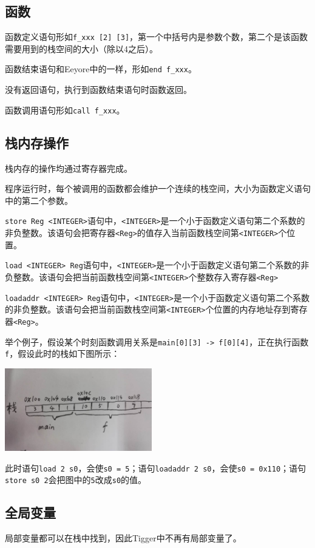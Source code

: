 \documentclass{ctexart}
\begin{document}
\subsection{函数}
函数定义语句形如\texttt{f\_xxx [2] [3]}，第一个中括号内是参数个数，第二个是该函数需要用到的栈空间的大小（除以4之后）。

函数结束语句和Eeyore中的一样，形如\texttt{end f\_xxx}。

没有返回语句，执行到函数结束语句时函数返回。

函数调用语句形如\texttt{call f\_xxx}。
\subsection{栈内存操作}
栈内存的操作均通过寄存器完成。

程序运行时，每个被调用的函数都会维护一个连续的栈空间，大小为函数定义语句中的第二个参数。

\texttt{store Reg <INTEGER>}语句中，\texttt{<INTEGER>}是一个小于函数定义语句第二个系数的非负整数。该语句会把寄存器\texttt{<Reg>}的值存入当前函数栈空间第\texttt{<INTEGER>}个位置。

\texttt{load <INTEGER> Reg}语句中，\texttt{<INTEGER>}是一个小于函数定义语句第二个系数的非负整数。该语句会把当前函数栈空间第\texttt{<INTEGER>}个整数存入寄存器\texttt{<Reg>}

\texttt{loadaddr <INTEGER> Reg}语句中，\texttt{<INTEGER>}是一个小于函数定义语句第二个系数的非负整数。该语句会把当前函数栈空间第\texttt{<INTEGER>}个位置的内存地址存到寄存器\texttt{<Reg>}。

举个例子，假设某个时刻函数调用关系是\texttt{main[0][3] -> f[0][4]}，正在执行函数\texttt{f}，假设此时的栈如下图所示：

\begin{center}\includegraphics[width=6.4cm,height=3.6cm]{stack}\end{center}

此时语句\texttt{load 2 s0}，会使\texttt{s0 = 5}；语句\texttt{loadaddr 2 s0}，会使\texttt{s0 = 0x110}；语句\texttt{store s0 2}会把图中的\texttt{5}改成\texttt{s0}的值。

\subsection{全局变量}
局部变量都可以在栈中找到，因此Tigger中不再有局部变量了。
\end{document}
